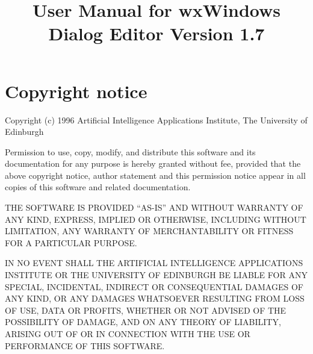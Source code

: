 
\parskip=10pt
\parindent=0pt
\title{User Manual for wxWindows Dialog Editor Version 1.7}
\makeindex

\maketitle
\pagestyle{fancyplain}

\setfooter{\thepage}{}{}{}{}{\thepage}%
\tableofcontents

\chapter*{Copyright notice}
%
\setfooter{\thepage}{}{}{}{}{\thepage}%

\begin{center}
Copyright (c) 1996 Artificial Intelligence Applications Institute,
The University of Edinburgh\\
\end{center}

Permission to use, copy, modify, and distribute this software and its
documentation for any purpose is hereby granted without fee, provided that the
above copyright notice, author statement and this permission notice appear in
all copies of this software and related documentation.

THE SOFTWARE IS PROVIDED ``AS-IS'' AND WITHOUT WARRANTY OF ANY KIND, EXPRESS,
IMPLIED OR OTHERWISE, INCLUDING WITHOUT LIMITATION, ANY WARRANTY OF
MERCHANTABILITY OR FITNESS FOR A PARTICULAR PURPOSE.

IN NO EVENT SHALL THE ARTIFICIAL INTELLIGENCE APPLICATIONS INSTITUTE OR THE
UNIVERSITY OF EDINBURGH BE LIABLE FOR ANY SPECIAL, INCIDENTAL, INDIRECT OR
CONSEQUENTIAL DAMAGES OF ANY KIND, OR ANY DAMAGES WHATSOEVER RESULTING FROM
LOSS OF USE, DATA OR PROFITS, WHETHER OR NOT ADVISED OF THE POSSIBILITY OF
DAMAGE, AND ON ANY THEORY OF LIABILITY, ARISING OUT OF OR IN CONNECTION WITH
THE USE OR PERFORMANCE OF THIS SOFTWARE.







\newpage

\printindex

